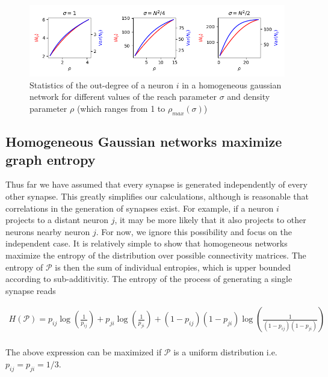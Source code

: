\documentclass{ucetd}
\begin{document}
\begin{figure}
\centering
\includegraphics[width=165mm]{fig_8}
\caption{Statistics of the out-degree of a neuron $i$ in a homogeneous gaussian network for different values of the reach parameter $\sigma$ and density parameter $\rho$ (which ranges from 1 to $\rho_{max}(\sigma)$)}
\end{figure}



\subsection{Homogeneous Gaussian networks maximize graph entropy}

Thus far we have assumed that every synapse is generated independently of every other synapse. This greatly simplifies our calculations, although is reasonable that correlations in the generation of synapses exist. For example, if a neuron $i$ projects to a distant neuron $j$, it may be more likely that it also projects to other neurons nearby neuron $j$. For now, we ignore this possibility and focus on the independent case. It is relatively simple to show that homogeneous networks maximize the entropy of the distribution over possible connectivity matrices. The entropy of $\mathcal{P}$ is then the sum of individual entropies, which is upper bounded according to sub-additivitiy. The entropy of the process of generating a single synapse reads

\begin{align*}
H(\mathcal{P}) = p_{ij}\log\left(\frac{1}{p_{ij}}\right) + p_{ji}\log\left(\frac{1}{p_{ji}}\right) + (1-p_{ij})(1-p_{ji})\log\left(\frac{1}{(1-p_{ij})(1-p_{ji})}\right)\\
\end{align*}

The above expression can be maximized if $\mathcal{P}$ is a uniform distribution i.e. $p_{ij} = p_{ji} = 1/3$.
\end{document}
